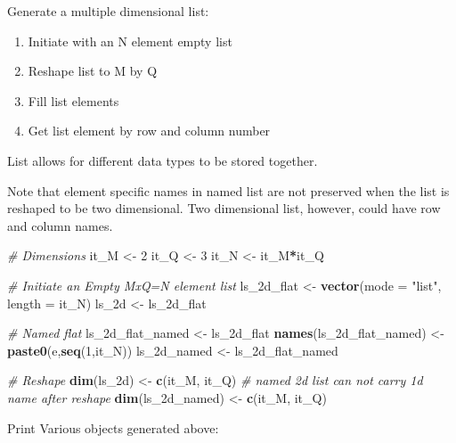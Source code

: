 \documentclass[
]{book}
\newenvironment{Shaded}{\begin{snugshade}}{\end{snugshade}}
\newcommand{\CommentTok}[1]{\textcolor[rgb]{0.56,0.35,0.01}{\textit{#1}}}
\newcommand{\DataTypeTok}[1]{\textcolor[rgb]{0.13,0.29,0.53}{#1}}
\newcommand{\DecValTok}[1]{\textcolor[rgb]{0.00,0.00,0.81}{#1}}
\newcommand{\KeywordTok}[1]{\textcolor[rgb]{0.13,0.29,0.53}{\textbf{#1}}}
\newcommand{\NormalTok}[1]{#1}
\newcommand{\OperatorTok}[1]{\textcolor[rgb]{0.81,0.36,0.00}{\textbf{#1}}}
\newcommand{\StringTok}[1]{\textcolor[rgb]{0.31,0.60,0.02}{#1}}
\providecommand{\tightlist}{%
  \setlength{\itemsep}{0pt}\setlength{\parskip}{0pt}}
\begin{document}
Generate a multiple dimensional list:

\begin{enumerate}
\def\labelenumi{\arabic{enumi}.}
\tightlist
\item
  Initiate with an N element empty list
\item
  Reshape list to M by Q
\item
  Fill list elements
\item
  Get list element by row and column number
\end{enumerate}

List allows for different data types to be stored together.

Note that element specific names in named list are not preserved when the list is reshaped to be two dimensional. Two dimensional list, however, could have row and column names.

\begin{Shaded}
\begin{Highlighting}[]
\CommentTok{\# Dimensions}
\NormalTok{it\_M \textless{}{-}}\StringTok{ }\DecValTok{2}
\NormalTok{it\_Q \textless{}{-}}\StringTok{ }\DecValTok{3}
\NormalTok{it\_N \textless{}{-}}\StringTok{ }\NormalTok{it\_M}\OperatorTok{*}\NormalTok{it\_Q}

\CommentTok{\# Initiate an Empty MxQ=N element list}
\NormalTok{ls\_2d\_flat \textless{}{-}}\StringTok{ }\KeywordTok{vector}\NormalTok{(}\DataTypeTok{mode =} \StringTok{"list"}\NormalTok{, }\DataTypeTok{length =}\NormalTok{ it\_N)}
\NormalTok{ls\_2d \textless{}{-}}\StringTok{ }\NormalTok{ls\_2d\_flat}

\CommentTok{\# Named flat}
\NormalTok{ls\_2d\_flat\_named \textless{}{-}}\StringTok{ }\NormalTok{ls\_2d\_flat}
\KeywordTok{names}\NormalTok{(ls\_2d\_flat\_named) \textless{}{-}}\StringTok{ }\KeywordTok{paste0}\NormalTok{(}\StringTok{\textquotesingle{}e\textquotesingle{}}\NormalTok{,}\KeywordTok{seq}\NormalTok{(}\DecValTok{1}\NormalTok{,it\_N))}
\NormalTok{ls\_2d\_named \textless{}{-}}\StringTok{ }\NormalTok{ls\_2d\_flat\_named}

\CommentTok{\# Reshape}
\KeywordTok{dim}\NormalTok{(ls\_2d) \textless{}{-}}\StringTok{ }\KeywordTok{c}\NormalTok{(it\_M, it\_Q)}
\CommentTok{\# named 2d list can not carry 1d name after reshape}
\KeywordTok{dim}\NormalTok{(ls\_2d\_named) \textless{}{-}}\StringTok{ }\KeywordTok{c}\NormalTok{(it\_M, it\_Q)}
\end{Highlighting}
\end{Shaded}

Print Various objects generated above:
\end{document}
